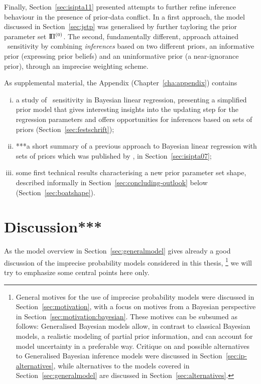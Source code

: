 Finally, Section~\ref{sec:isipta11} presented attempts to further refine
inference behaviour in the presence of prior-data conflict.
In a first approach, the model discussed in Section~\ref{sec:jstp} %
was generalised by further tayloring the prior parameter set $\text{I}\!\Pi^{(0)}$. %
The second, fundamentally different, approach attained \pdc\ sensitivity
by combining \emph{inferences} based on two different priors,
an informative prior (expressing prior beliefs) and an uninformative prior (a near-ignorance prior),
through an imprecise weighting scheme.

As supplemental material, the Appendix (Chapter~\ref{cha:appendix}) contains
\begin{enumerate}[(i)]
\item a study of \pdc\ sensitivity in Bayesian linear regression,
presenting a simplified prior model that gives interesting insights into the updating step
for the regression parameters and offers opportunities for inferences based on sets of priors
(Section~\ref{sec:festschrift});
\item ***a short summary of a previous approach to Bayesian linear regression
with sets of priors which was published by \textcite{Walter2007a}, in Section~\ref{sec:isipta07};
\item some first technical results characterising a new prior parameter set shape,
described informally in Section~\ref{sec:concluding-outlook} below
(Section~\ref{sec:boatshape}).
\end{enumerate}


\section{Discussion***}
\label{sec:concluding-discussion}


As the model overview in Section~\ref{sec:generalmodel} gives already a good discussion
of the imprecise probability models considered in this thesis,%
\footnote{General motives for the use of imprecise probability models
were discussed in Section~\ref{sec:motivation},
with a focus on motives from a Bayesian perspective in Section~\ref{sec:motivation:bayesian}.
These motives can be subsumed as follows:
Generalised Bayesian models allow, in contrast to classical Bayesian models,
a realistic modeling of partial prior information,
and can account for model uncertainty in a preferable way.
Critique on and possible alternatives to Generalised Bayesian inference models
were discussed in Section~\ref{sec:ip-alternatives},
while alternatives to the models covered in Section~\ref{sec:generalmodel} are discussed in Section~\ref{sec:alternatives}.}
we will try to emphasize some central points here only.

